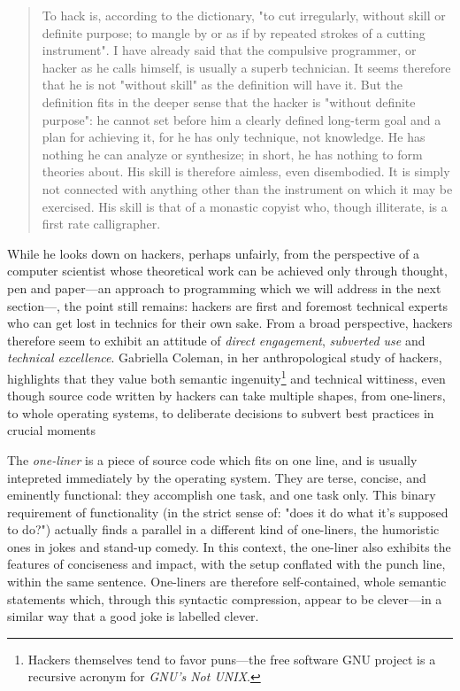 \begin{quote}
  To hack is, according to the dictionary, "to cut irregularly, without skill or definite purpose; to mangle by or as if by repeated strokes of a cutting instrument". I have already said that the compulsive programmer, or hacker as he calls himself, is usually a superb technician. It seems therefore that he is not "without skill" as the definition will have it. But the definition fits in the deeper sense that the hacker is "without definite purpose": he cannot set before him a clearly defined long-term goal and a plan for achieving it, for he has only technique, not knowledge. He has nothing he can analyze or synthesize; in short, he has nothing to form theories about. His skill is therefore aimless, even disembodied. It is simply not connected with anything other than the instrument on which it may be exercised. His skill is that of a monastic copyist who, though illiterate, is a first rate calligrapher. \citep{weizenbaum_computer_1976}
\end{quote}

While he looks down on hackers, perhaps unfairly, from the perspective of a computer scientist whose theoretical work can be achieved only through thought, pen and paper—an approach to programming which we will address in the next section—, the point still remains: hackers are first and foremost technical experts who can get lost in technics for their own sake. From a broad perspective, hackers therefore seem to exhibit an attitude of \emph{direct engagement}, \emph{subverted use} and \emph{technical excellence}.  Gabriella Coleman, in her anthropological study of hackers, highlights that they value both semantic ingenuity\footnote{Hackers themselves tend to favor puns—the free software GNU project is a recursive acronym for \emph{GNU's Not UNIX}.} and technical wittiness, even though source code written by hackers can take multiple shapes, from one-liners, to whole operating systems, to deliberate decisions to subvert best practices in crucial moments

The \emph{one-liner} is a piece of source code which fits on one line, and is usually intepreted immediately by the operating system. They are terse, concise, and eminently functional: they accomplish one task, and one task only. This binary requirement of functionality (in the strict sense of: "does it do what it's supposed to do?") actually finds a parallel in a different kind of one-liners, the humoristic ones in jokes and stand-up comedy. In this context, the one-liner also exhibits the features of conciseness and impact, with the setup conflated with the punch line, within the same sentence. One-liners are therefore self-contained, whole semantic statements which, through this syntactic compression, appear to be clever—in a similar way that a good joke is labelled clever.

